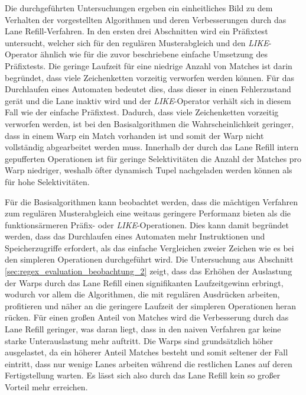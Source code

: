 Die durchgeführten Untersuchungen ergeben ein einheitliches Bild zu dem Verhalten der vorgestellten Algorithmen und deren Verbesserungen durch das Lane Refill-Verfahren.
In den ersten drei Abschnitten wird ein Präfixtest untersucht, welcher sich für den regulären Musterabgleich und den \emph{LIKE}-Operator ähnlich wie für die zuvor beschriebene einfache Umsetzung des Präfixtests.
Die geringe Laufzeit für eine niedrige Anzahl von Matches ist darin begründet, dass viele Zeichenketten vorzeitig verworfen werden können.
Für das Durchlaufen eines Automaten bedeutet dies, dass dieser in einen Fehlerzustand gerät und die Lane inaktiv wird und der \emph{LIKE}-Operator verhält sich in diesem Fall wie der einfache Präfixtest.
Dadurch, dass viele Zeichenketten vorzeitig verworfen werden, ist bei den Basisalgorithmen die Wahrscheinlichkeit geringer, dass in einem Warp ein Match vorhanden ist und somit der Warp nicht vollständig abgearbeitet werden muss.
Innerhalb der durch das Lane Refill intern gepufferten Operationen ist für geringe Selektivitäten die Anzahl der Matches pro Warp niedriger, weshalb öfter dynamisch Tupel nachgeladen werden können als für hohe Selektivitäten.

Für die Basisalgorithmen kann beobachtet werden, dass die mächtigen Verfahren zum regulären Musterabgleich eine weitaus geringere Performanz bieten als die funktionsärmeren Präfix- oder \emph{LIKE}-Operationen.
Dies kann damit begründet werden, dass das Durchlaufen eines Automaten mehr Instruktionen und Speicherzugriffe erfordert, als das einfache Vergleichen zweier Zeichen wie es bei den simpleren Operationen durchgeführt wird.
Die Untersuchung aus Abschnitt \ref{sec:regex_evaluation_beobachtung_2} zeigt, dass das Erhöhen der Auslastung der Warps durch das Lane Refill einen signifikanten Laufzeitgewinn erbringt, wodurch vor allem die Algorithmen, die mit regulären Ausdrücken arbeiten, profitieren und näher an die geringere Laufzeit der simpleren Operationen heran rücken.
Für einen großen Anteil von Matches wird die Verbesserung durch das Lane Refill geringer, was daran liegt, dass in den naiven Verfahren gar keine starke Unterauslastung mehr auftritt.
Die Warps sind grundsätzlich höher ausgelastet, da ein höherer Anteil Matches besteht und somit seltener der Fall eintritt, dass nur wenige Lanes arbeiten während die restlichen Lanes auf deren Fertigstellung warten.
Es lässt sich also durch das Lane Refill kein so großer Vorteil mehr erreichen.


